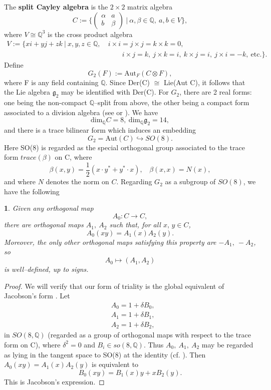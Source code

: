 \documentclass[12pt,letterpaper]{amsart}
\newcommand{\qqq}{\mathbb{Q}}
\newcommand{\proclaimname}{}
\newtheorem*{proclaimx}{\proclaimname}
\newenvironment{proclaim}[1]%
  {\renewcommand{\proclaimname}{#1}\begin{proclaimx}}{\end{proclaimx}}
\begin{document}
The \textbf{split Cayley algebra} is the $2\times 2$ matrix algebra
\[
C:=\Big\{\begin{pmatrix} \alpha&a\\b&\beta \end{pmatrix}\ | \
\alpha ,\beta \in \qqq,\ a,b \in V \Big\},\tag{A.4}
\]
where $V \cong \qqq^3$ is the cross product algebra
\[
\begin{split}
V:= \{ xi+yj+zk\ | \ x,y,z \in \qqq,
&\ i\times i = j\times j = k\times k = 0,\\
&\quad\quad
\ i\times j = k,\ j\times k = i,\ k\times j = i,\ j\times i = -k,
\ \text{etc.}\}.
\end{split}
\]
Define
\[
G_2(F) :=\text{Aut}_F(C\otimes F),\tag{A.5}
\]
where F is any field containing $\qqq$. Since Der(C) $\cong$ Lie(Aut C),
it follows that the Lie algebra ${\mathfrak g}_2$ may be
identified with Der(C). For $G_2$, there are 2 real forms:  one
being the non-compact $\qqq$--split from above, the other being a
compact form associated to a division algebra (see\cite[pp. 142-147]{Ja71}
or \cite{Ti65}). We have
\[
\text{dim}_{{\qqq}}C = 8,\ \text{dim}_{{\qqq}}{\mathfrak g}_2 = 14,
\]
and there is a trace bilinear form which induces an embedding
\[
G_2 = \text{Aut}(C) \hookrightarrow SO(8).
\]
Here SO(8) is regarded as the special orthogonal group associated to
the trace form $trace(\beta)$ on C, where
\[
\beta(x,y)=\frac{1}{2}(x\cdot y^*+y^*\cdot x),
\ \ \ \ \beta(x,x)=N(x),
\]
and where $N$ denotes the norm on $C$. Regarding $G_2$ as a subgroup of
$SO(8)$, we have the following

\begin{proclaim}{Triality theorem A.6(\cite{Ja71})} Given any orthogonal map
\[
A_0 : C \rightarrow C,
\]
there are orthogonal maps $A_1,\ A_2$ such that, for all $x,\,y \in C$,
\[
A_0(xy) = A_1(x)A_2(y).
\]
Moreover, the only other orthogonal maps satisfying this property are
$-A_1,\ -A_2$, so
\[
A_0 \longmapsto (A_1,A_2)
\]
is well--defined, up to signs.
\end{proclaim}

\begin{proof} We will verify that our form of triality is the global
equivalent of Jacobson's form \cite[p. 8]{Ja71}. Let
\[
\begin{split}
&A_0 = 1+\delta B_0,\\
&A_1 = 1+\delta B_1,\\
&A_2 = 1+\delta B_2,
\end{split}
\]
in $SO(8,\qqq )$ (regarded as a group of orthogonal maps with respect to the
trace form on C), where $\delta^2 = 0$ and $B_i \in so(8,\qqq )$. Thus
$A_0,\ A_1,\ A_2$ may be regarded as lying in the tangent space to SO(8)
at the identity (cf. \cite[chapter 0]{Bor91}). Then
$A_0(xy) = A_1(x)A_2(y)$ is equivalent to
\[
B_0(xy) = B_1(x)y+ xB_2(y).
\]
This is Jacobson's expression.
\end{proof}
\end{document}
